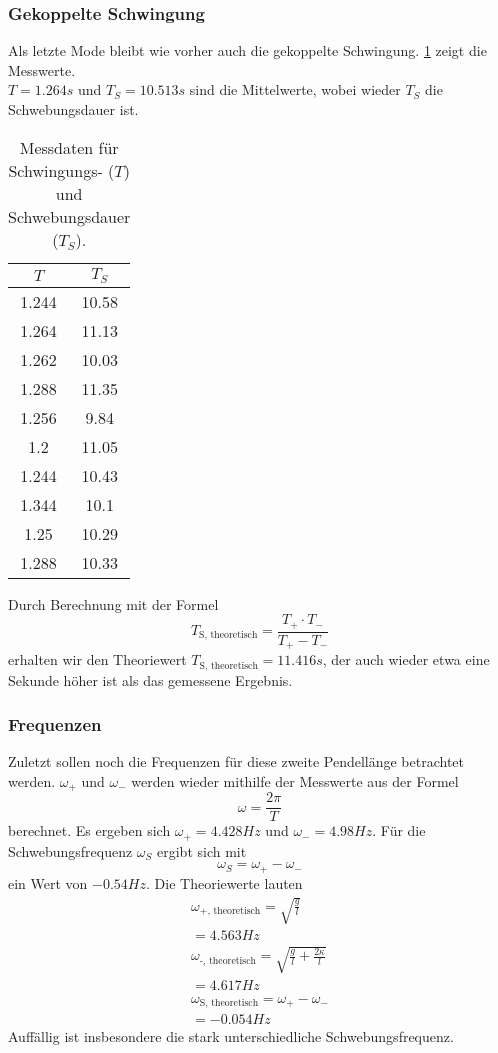 \subsubsection{Gekoppelte Schwingung}
Als letzte Mode bleibt wie vorher auch die gekoppelte Schwingung. \ref{tab:gek2} zeigt die Messwerte. \\
$T = 1.264s$ und $T_{S} = 10.513s$ sind die Mittelwerte, wobei wieder $T_{S}$ die Schwebungsdauer ist.
\begin{table}
    \centering
    \caption{Messdaten für Schwingungs- ($T$) und Schwebungsdauer ($T_{S}$).}
    \label{tab:gek2}
    \begin{tabular}{c c}
     \toprule
     $T$ & $T_{S}$\\
     \midrule
     1.244 & 10.58\\
     1.264 & 11.13\\
     1.262 & 10.03\\
     1.288 & 11.35\\
     1.256 & 9.84\\
     1.2 & 11.05\\
     1.244 & 10.43\\
     1.344 & 10.1\\
     1.25 & 10.29\\
     1.288 & 10.33\\
     \bottomrule
    \end{tabular}
\end{table}
Durch Berechnung mit der Formel 
\begin{equation}
T_\text{S, theoretisch} = \frac{T_{+} \cdot T_{-}}{T_{+} - T_{-}}
\end{equation}
erhalten wir den Theoriewert $T_\text{S, theoretisch} = 11.416s$, der auch wieder etwa eine Sekunde höher ist als das gemessene Ergebnis.

\subsubsection{Frequenzen}
Zuletzt sollen noch die Frequenzen für diese zweite Pendellänge betrachtet werden.
$\omega_{+}$ und $\omega_{-}$ werden wieder mithilfe der Messwerte aus der Formel
\begin{equation}
\omega = \frac{2 \pi}{T}
\end{equation}
berechnet. Es ergeben sich $\omega_{+} = 4.428Hz$ und $\omega_{-} = 4.98Hz$. Für die Schwebungsfrequenz $\omega_{S}$ ergibt sich mit 
\begin{equation}
\omega_{S} = \omega_{+} - \omega_{-}
\end{equation}
ein Wert von $-0.54 Hz$.
Die Theoriewerte lauten
\begin{align}
\omega_\text{+, theoretisch} = \sqrt{\frac{g}{l}}\\
    = 4.563Hz\\
\omega_\text{-, theoretisch} = \sqrt{\frac{g}{l} + \frac{2 \kappa}{l}}\\
    = 4.617Hz\\
\omega_\text{S, theoretisch} = \omega_{+} - \omega_{-}\\
    = -0.054Hz
\end{align}
Auffällig ist insbesondere die stark unterschiedliche Schwebungsfrequenz.